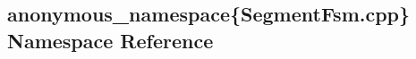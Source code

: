 \hypertarget{namespaceanonymous__namespace_02SegmentFsm_8cpp_03}{\subsection{anonymous\-\_\-namespace\{Segment\-Fsm.\-cpp\} Namespace Reference}
\label{namespaceanonymous__namespace_02SegmentFsm_8cpp_03}
}
